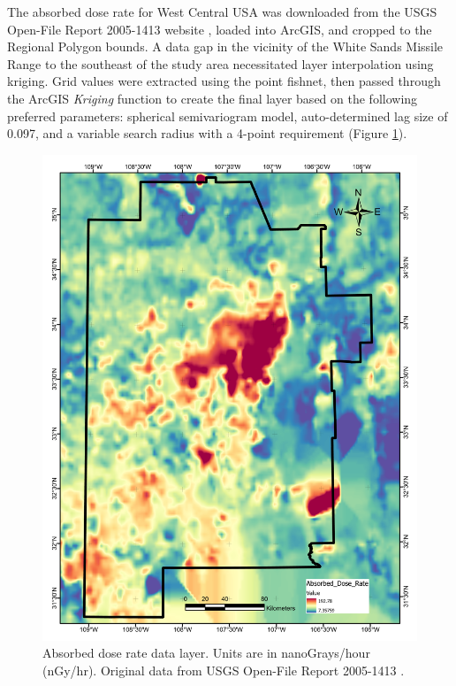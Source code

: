 The absorbed dose rate for West Central USA was downloaded from the USGS Open-File Report 2005-1413 website \citep{duval_terrestrial_2005}, loaded into ArcGIS, and cropped to the Regional Polygon bounds. A data gap in the vicinity of the White Sands Missile Range to the southeast of the study area necessitated layer interpolation using kriging. Grid values were extracted using the point fishnet, then passed through the ArcGIS \textit{Kriging} function to create the final layer based on the following preferred parameters: spherical semivariogram model, auto-determined lag size of 0.097, and a variable search radius with a 4-point requirement (Figure \ref{fig:feat_gamma}).
\vfill
\pagebreak

\begin{figure}[H]
\centering
\includegraphics[width=0.75\linewidth]{templates/images/Figure-AbsorbedDose.pdf}
\caption[Absorbed dose rate data layer]{Absorbed dose rate data layer. Units are in nanoGrays/hour (nGy/hr). Original data from USGS Open-File Report 2005-1413 \protect\citep{duval_terrestrial_2005}.}
\label{fig:feat_gamma}
\end{figure}
\pagebreak

